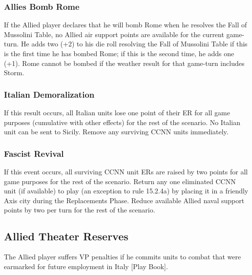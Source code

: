 \subsubsection{Allies Bomb Rome}

If the Allied player declares that he will bomb Rome when he resolves the Fall of Mussolini Table, no Allied air support points are available for the current game-turn. He adds two (+2) to his die roll resolving the Fall of Mussolini Table if this is the first time he has bombed Rome; if this is the second time, he adds one (+1). Rome cannot be bombed if the weather result for that game-turn includes Storm.

\subsubsection{Italian Demoralization}

If this result occurs, all Italian units lose one point of their ER for all game purposes (cumulative with other effects) for the rest of the scenario. No Italian unit can be sent to Sicily. Remove any surviving CCNN units immediately.

\subsubsection{Fascist Revival}

If this event occurs, all surviving CCNN unit ERs are raised by two points for all game purposes for the rest of the scenario. Return any one eliminated CCNN unit (if available) to play (an exception to rule 15.2.4a) by placing it in a friendly Axis city during the Replacements Phase. Reduce available Allied naval support points by two per turn for the rest of the scenario.

\subsection{Allied Theater Reserves}

The Allied player suffers VP penalties if he commits units to combat that were earmarked for future employment in Italy [Play Book].
